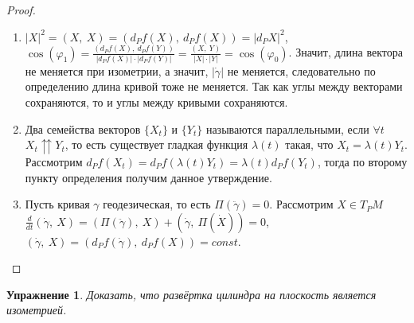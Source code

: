 \documentclass[12pt]{article}
\newcommand\tab[1][.5cm]{\hspace*{#1}}
\theoremstyle{plain}
\newtheorem*{exercise}{Упражнение}
\renewcommand{\phi}{\varphi}
\begin{document}
    \begin{proof}\tab
        \begin{enumerate}
            \item $|X|^2=(X, \ X)=(d_Pf(X), \ d_Pf(X))=|d_PX|^2$, $\cos(\phi_1)=\frac{(d_Pf(X), \ d_Pf(Y))}{|d_Pf(X)|\cdot|d_Pf(Y)|}=\frac{(X, \ Y)}{|X|\cdot|Y|}=\cos(\phi_0)$. Значит, длина вектора не меняется при изометрии, а значит, $|\dot{\gamma}|$ не меняется, следовательно по определению длина кривой тоже не меняется. Так как углы между векторами сохраняются, то и углы между кривыми сохраняются.
            \item Два семейства векторов $\{X_t\}$ и $\{Y_t\}$ называются параллельными, если $\forall t$ $X_t\upuparrows Y_t$, то есть существует гладкая функция $\lambda(t)$ такая, что $X_t=\lambda(t)Y_t$. Рассмотрим $d_Pf(X_t)=d_Pf(\lambda(t)Y_t)=\lambda(t)d_Pf(Y_t)$, тогда по второму пункту определения получим данное утверждение.
            \item Пусть кривая $\gamma$ геодезическая, то есть $\Pi(\ddot{\gamma})=0$. Рассмотрим $X\in T_PM$ $\frac{d}{dt}(\dot{\gamma}, \ X)=(\Pi(\ddot{\gamma}), \ X)+(\dot{\gamma}, \ \Pi(\dot{X}))=0$, $(\dot{\gamma}, \ X)=(d_Pf(\dot{\gamma}), \ d_Pf(X))=const$.
        \end{enumerate}
    \end{proof}
    \begin{exercise}
        Доказать, что развёртка цилиндра на плоскость является изометрией.
    \end{exercise}
\end{document}
